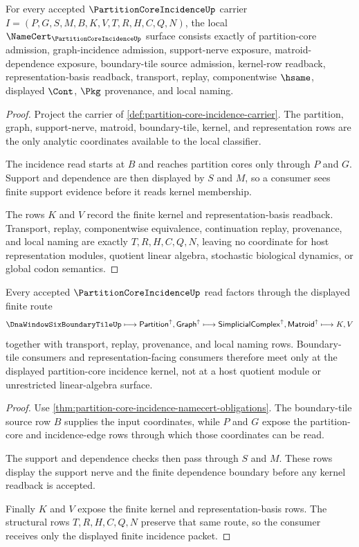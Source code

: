 \begin{theorem}
\label{thm:partition-core-incidence-namecert-obligations}
For every accepted $\PartitionCoreIncidenceUp$ carrier $I=(P,G,S,M,B,K,V,T,R,H,C,Q,N)$, the local $\NameCert_{\PartitionCoreIncidenceUp}$ surface consists exactly of partition-core admission, graph-incidence admission, support-nerve exposure, matroid-dependence exposure, boundary-tile source admission, kernel-row readback, representation-basis readback, transport, replay, componentwise $\hsame$, displayed $\Cont$, $\Pkg$ provenance, and local naming.
\end{theorem}
\begin{proof}
Project the carrier of \autoref{def:partition-core-incidence-carrier}. The partition, graph, support-nerve, matroid, boundary-tile, kernel, and representation rows are the only analytic coordinates available to the local classifier.

The incidence read starts at $B$ and reaches partition cores only through $P$ and $G$. Support and dependence are then displayed by $S$ and $M$, so a consumer sees finite support evidence before it reads kernel membership.

The rows $K$ and $V$ record the finite kernel and representation-basis readback. Transport, replay, componentwise equivalence, continuation replay, provenance, and local naming are exactly $T,R,H,C,Q,N$, leaving no coordinate for host representation modules, quotient linear algebra, stochastic biological dynamics, or global codon semantics.
\end{proof}

\begin{theorem}
\label{thm:partition-core-incidence-kernel-handoff}
Every accepted $\PartitionCoreIncidenceUp$ read factors through the displayed finite route
$$
\DnaWindowSixBoundaryTileUp \longmapsto \mathsf{Partition}^{\uparrow},\mathsf{Graph}^{\uparrow} \longmapsto \mathsf{SimplicialComplex}^{\uparrow},\mathsf{Matroid}^{\uparrow} \longmapsto K,V
$$
together with transport, replay, provenance, and local naming rows. Boundary-tile consumers and representation-facing consumers therefore meet only at the displayed partition-core incidence kernel, not at a host quotient module or unrestricted linear-algebra surface.
\end{theorem}
\begin{proof}
Use \autoref{thm:partition-core-incidence-namecert-obligations}. The boundary-tile source row $B$ supplies the input coordinates, while $P$ and $G$ expose the partition-core and incidence-edge rows through which those coordinates can be read.

The support and dependence checks then pass through $S$ and $M$. These rows display the support nerve and the finite dependence boundary before any kernel readback is accepted.

Finally $K$ and $V$ expose the finite kernel and representation-basis rows. The structural rows $T,R,H,C,Q,N$ preserve that same route, so the consumer receives only the displayed finite incidence packet.
\end{proof}

